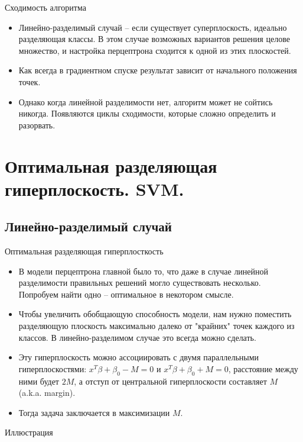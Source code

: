 \documentclass[9pt]{beamer}
\begin{document}
\begin{frame}{Сходимость алгоритма}
\begin{itemize}
    \item Линейно-разделимый случай -- если существует суперплоскость, идеально разделяющая классы. В этом случае возможных вариантов решения целове множество, и настройка перцептрона сходится к одной из этих плоскостей.
    \item Как всегда в градиентном спуске результат зависит от начального положения точек.
    \item Однако когда линейной разделимости нет, алгоритм может не сойтись никогда. Появляются циклы сходимости, которые сложно определить и разорвать.
\end{itemize}
\end{frame}

\section{Оптимальная разделяющая гиперплоскость. SVM.}
\subsection{Линейно-разделимый случай}

\begin{frame}{Оптимальная разделяющая гиперплосткость}
\begin{itemize}
    \item В модели перцептрона главной было то, что даже в случае линейной разделимости правильных решений могло существовать несколько. Попробуем найти одно -- оптимальное в некотором смысле.
    \item Чтобы увеличить обобщающую способность модели, нам нужно поместить разделяющую плоскость максимально далеко от "крайних" точек каждого из классов. В линейно-разделимом случае это всегда можно сделать.
    \item Эту гиперплоскость можно ассоциировать с двумя параллельными гиперплоскостями: $x^T\beta+\beta_0-M=0$ и $x^T\beta+\beta_0 + M=0$, расстояние между ними будет $2M$, а отступ от центральной гиперплоскости составляет $M$ (a.k.a. margin).
    \item Тогда задача заключается в максимизации $M$.
\end{itemize}
\end{frame}

\begin{frame}{Иллюстрация}
\end{frame}
\end{document}

